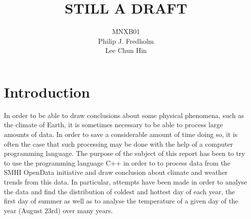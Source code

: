 \documentclass[a4, 12pt]{article}
\title{STILL A DRAFT}
\author{MNXB01 \\ Philip J. Fredholm \\Lee Chun Hin }
\begin{document}
\maketitle
\tableofcontents
\newpage

\section{Introduction}
In order to be able to draw conclusions about some physical phenomena, such as the climate of Earth, it is sometimes necessary to be able to process large amounts of data. In order to save a considerable amount of time doing so, it is often the case that such processing may be done with the help of a computer programming language. The purpose of the subject of this report has been to try to use the programming language C++ in order to to process data from the SMHI OpenData initiative and draw conclusion about climate and weather trends from this data. In particular, attempts have been made in order to analyse the data and find the distribution of coldest and hottest day of each year, the first day of summer as well as to analyse the temperature of a given day of the year (August 23rd) over many years.
\end{document}
